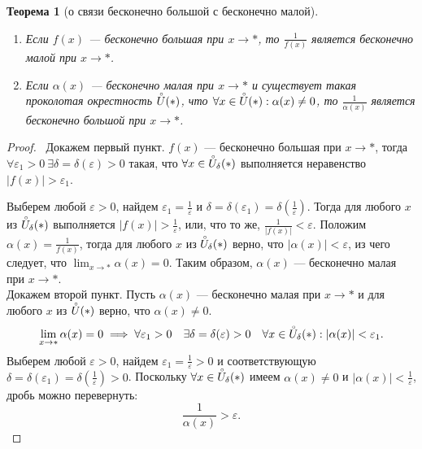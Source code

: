 \documentclass[a4paper,12pt]{article} %
\newtheorem{theorem}{Теорема}[section]
\theoremstyle{remark}
\theoremstyle{definition}
\begin{document}
\begin{theorem}[о связи бесконечно большой с бесконечно малой]\ 
	\begin{enumerate}
		\item Если $f(x)$ --- бесконечно большая при $x\to *$, то $\displaystyle \frac{1}{f(x)}$ 
            является бесконечно малой при $x\to *$.
		\item Если $\alpha(x)$ --- бесконечно малая при $x \to *$ и существует такая проколотая окрестность 
            $\accentset{\circ}{U}(*)$, что $\forall x \in  \accentset{\circ}{U}(*) : \alpha(x) \neq 0$, 
            то $\displaystyle \frac{1}{\alpha(x)}$ является бесконечно большой при $x\to *$.
	\end{enumerate}		
\end{theorem}
\begin{proof}\
    Докажем первый пункт. $f(x)$ --- бесконечно большая при $x \to *$, тогда $\forall \varepsilon_1 > 0 \ \exists 
    \delta=\delta(\varepsilon)>0$ такая, что $\forall x \in \accentset{\circ}{U}_\delta(*)$
    выполняется неравенство $|f(x)|>\varepsilon_1$.

    Выберем любой $\varepsilon>0$, найдем $\displaystyle \varepsilon_1=\frac{1}{\varepsilon}$ и 
    $\delta=\delta(\varepsilon_1)=\delta(\frac{1}{\varepsilon})$. 
    Тогда для любого $x$ из $\displaystyle \accentset{\circ}{U}_\delta(*)$ выполняется 
    $\displaystyle |f(x)|>\frac{1}{\varepsilon}$,
    или, что то же, $\displaystyle \frac{1}{|f(x)|} < \varepsilon$. Положим $\displaystyle \alpha(x) = \frac{1}{f(x)}$,
    тогда для любого $x$ из $\accentset{\circ}{U}_\delta(*)$ верно, что $|\alpha(x)| < \varepsilon$,
    из чего следует, что $\displaystyle \lim_{x \to *} \alpha(x) = 0$.
    Таким образом, $\alpha(x)$ --- бесконечно малая при $x\to *$.
    \\[12pt]

	Докажем второй пункт.
    Пусть $\alpha(x)$ --- бесконечно малая при $x\to *$ и для любого $x$ из $\accentset{\circ}{U}(*)$ верно,
    что $\alpha(x)\neq 0$. 
    \[\lim_{x \to *} \alpha(x) = 0 \implies\forall \varepsilon_1>0 \quad \exists \delta=\delta(\varepsilon)>0 \quad
    \forall x\in \accentset{\circ}{U}_\delta(*) : |\alpha(x)| < \varepsilon_1.\] 
    Выберем любой $\varepsilon>0$, найдем $\varepsilon_1=\frac{1}{\varepsilon}>0$ и соответствующую 
    $\delta=\delta(\varepsilon_1)=\delta(\frac{1}{\varepsilon})>0$. Поскольку $\forall x\in \accentset{\circ}{U}_\delta(*)$
    имеем $\alpha(x)\neq 0$ и $\displaystyle |\alpha(x)| < \frac{1}{\varepsilon}$, дробь можно перевернуть:
    \[\frac{1}{\alpha(x)} > \varepsilon.\] 


\end{proof}
\end{document}
